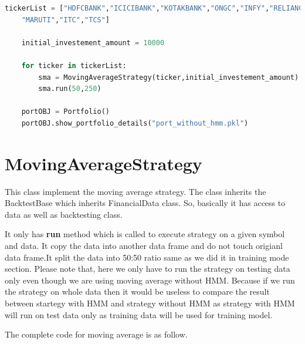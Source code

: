 \documentclass{report}
\begin{document}
\begin{lstlisting}[language=Python]
tickerList = ["HDFCBANK","ICICIBANK","KOTAKBANK","ONGC","INFY","RELIANCE","HDFC","LT","IOC","SBIN","HINDUNILVR",
	"MARUTI","ITC","TCS"]

	initial_investement_amount = 10000

	for ticker in tickerList:
		sma = MovingAverageStrategy(ticker,initial_investement_amount)
		sma.run(50,250)

	portOBJ = Portfolio()
	portOBJ.show_portfolio_details("port_without_hmm.pkl")
\end{lstlisting}

\section{MovingAverageStrategy}
This class implement the moving average strategy. The class inherits the BacktestBase which inherits FinancialData class. So, basically it has access to data as well as backtesting class. 

It only has \textbf{run} method which is called to execute strategy on a given symbol and data. It copy the data into another data frame and do not touch origianl data frame.It split the data into 50:50 ratio same as we did it in training mode section. Please note that, here we only have to run the strategy on testing data only even though we are using moving average without HMM. Because if we run the strategy on whole data then it would be useless to compare the result between startegy with HMM and strategy without HMM as strategy with HMM will run on test data only as training data will be used for training model.

The complete code for moving average is as follow.
\end{document}
